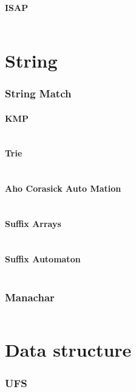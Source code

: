\documentclass[a4paper,10pt]{article}
\begin{document}
            \subsection{ISAP}
                \inputminted[breaklines]{c++}{graph/isap.cc}
	
	\newpage
	\part{String}
		\section{String Match}
			\subsection{KMP}
				\inputminted[breaklines]{c++}{String/kmp.cc}
		
			\subsection{Trie}
				\inputminted[breaklines]{c++}{String/Trie.cc}
			
			\subsection{Aho Corasick Auto Mation}
				\inputminted[breaklines]{c++}{String/Aho-Corasick_Auto_Mation.cc}
			
			\subsection{Suffix Arrays}
				\inputminted[breaklines]{c++}{String/Suffix_Arrays.cc}
			\newpage
			\subsection{Suffix Automaton}
				\inputminted[breaklines]{c++}{String/suffix-automaton.cc}
				
		\newpage
		\section{Manachar}
			\inputminted[breaklines]{c++}{String/Manachar.cc}
	
	
	\newpage
	\part{Data structure}
		\section{UFS}
			\inputminted[breaklines]{c++}{Date_structure/UFS.cc}
			
\end{document}
